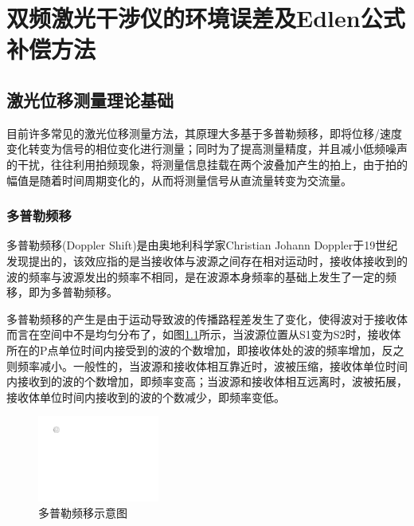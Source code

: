 \chapter{双频激光干涉仪的环境误差及Edlen公式补偿方法}
\section{激光位移测量理论基础}
目前许多常见的激光位移测量方法，其原理大多基于多普勒频移，即将位移/速度变化转变为信号的相位变化进行测量；同时为了提高测量精度，并且减小低频噪声的干扰，往往利用拍频现象，将测量信息挂载在两个波叠加产生的拍上，由于拍的幅值是随着时间周期变化的，从而将测量信号从直流量转变为交流量。

\subsection{多普勒频移}
多普勒频移(Doppler Shift)是由奥地利科学家Christian Johann Doppler于19世纪发现提出的\cite{基于激光多普勒测速的自由场空气声压测量研究}，该效应指的是当接收体与波源之间存在相对运动时，接收体接收到的波的频率与波源发出的频率不相同，是在波源本身频率的基础上发生了一定的频移，即为多普勒频移。

多普勒频移的产生是由于运动导致波的传播路程差发生了变化，使得波对于接收体而言在空间中不是均匀分布了，如图\ref{fig:多普勒频移示意图}所示，当波源位置从S1变为S2时，接收体所在的P点单位时间内接受到的波的个数增加，即接收体处的波的频率增加，反之则频率减小。一般性的，当波源和接收体相互靠近时，波被压缩，接收体单位时间内接收到的波的个数增加，即频率变高；当波源和接收体相互远离时，波被拓展，接收体单位时间内接收到的波的个数减少，即频率变低。
\begin{figure}[htb]
    \centering
    \includegraphics[width=4cm]{fig/2-fig/多普勒频移示意图.drawio.pdf}
    \caption{多普勒频移示意图}
    \label{fig:多普勒频移示意图}
  \end{figure}


